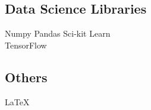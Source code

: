 \documentclass[letterpaper]{deedy-resume} %
\begin{document}
\begin{minipage}[t]{0.33\textwidth}
\sectionspace

\subsection{Data Science Libraries}
Numpy \textbullet{} Pandas \textbullet{} Sci-kit Learn \\
TensorFlow \\

\sectionspace

\subsection{Others}
\LaTeX

\sectionspace %


\end{minipage} %
\hfill
%
%
\end{document}

